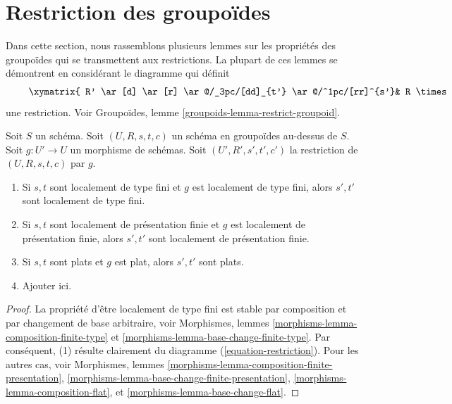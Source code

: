 \section{Restriction des groupoïdes}
\label{section-restricting-groupoids}

\noindent
Dans cette section, nous rassemblons plusieurs lemmes sur les
propriétés des groupoïdes qui se transmettent aux restrictions.
La plupart de ces lemmes se démontrent en considérant le
diagramme qui définit
\begin{equation}
\label{equation-restriction}
\vcenter{
\xymatrix{
R' \ar[d] \ar[r] \ar@/_3pc/[dd]_{t'} \ar@/^1pc/[rr]^{s'}&
R \times_{s, U} U' \ar[r] \ar[d] &
U' \ar[d]^g \\
U' \times_{U, t} R \ar[d] \ar[r] &
R \ar[r]^s \ar[d]_t &
U \\
U' \ar[r]^g &
U
}
}
\end{equation}
une restriction. Voir
Groupoïdes, lemme \ref{groupoids-lemma-restrict-groupoid}.

\begin{lemma}
\label{lemma-restrict-preserves-type}
Soit $S$ un schéma.
Soit $(U, R, s, t, c)$ un schéma en groupoïdes au-dessus de $S$.
Soit $g : U' \to U$ un morphisme de schémas.
Soit $(U', R', s', t', c')$ la restriction de
$(U, R, s, t, c)$ par $g$.
\begin{enumerate}
\item Si $s, t$ sont localement de type fini et $g$ est localement de
type fini, alors $s', t'$ sont localement de type fini.
\item Si $s, t$ sont localement de présentation finie et $g$ est localement de
présentation finie, alors $s', t'$ sont localement de présentation finie.
\item Si $s, t$ sont plats et $g$ est plat, alors $s', t'$ sont plats.
\item Ajouter ici.
\end{enumerate}
\end{lemma}

\begin{proof}
La propriété d'être localement de type fini est stable par composition
et par changement de base arbitraire, voir
Morphismes, lemmes \ref{morphisms-lemma-composition-finite-type} et
\ref{morphisms-lemma-base-change-finite-type}.
Par conséquent, (1) résulte clairement du diagramme (\ref{equation-restriction}).
Pour les autres cas, voir
Morphismes, lemmes \ref{morphisms-lemma-composition-finite-presentation},
\ref{morphisms-lemma-base-change-finite-presentation},
\ref{morphisms-lemma-composition-flat}, et
\ref{morphisms-lemma-base-change-flat}.
\end{proof}

